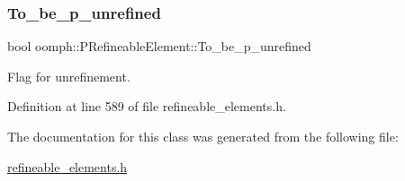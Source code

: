 \mbox{\label{classoomph_1_1PRefineableElement_a8b7f94da147a1639c4ba40464f768c32}} 
\subsubsection{\texorpdfstring{To\+\_\+be\+\_\+p\+\_\+unrefined}{To\_be\_p\_unrefined}}
{\footnotesize\ttfamily bool oomph\+::\+P\+Refineable\+Element\+::\+To\+\_\+be\+\_\+p\+\_\+unrefined\hspace{0.3cm}{\ttfamily [protected]}}



Flag for unrefinement. 



Definition at line 589 of file refineable\+\_\+elements.\+h.



The documentation for this class was generated from the following file\+:\begin{DoxyCompactItemize}
\item 
\hyperlink{refineable__elements_8h}{refineable\+\_\+elements.\+h}\end{DoxyCompactItemize}
